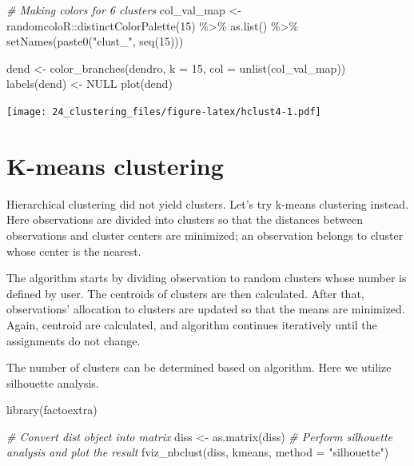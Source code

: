 \documentclass[
]{book}
\newenvironment{Shaded}{\begin{snugshade}}{\end{snugshade}}
\newcommand{\AttributeTok}[1]{\textcolor[rgb]{0.77,0.63,0.00}{#1}}
\newcommand{\CommentTok}[1]{\textcolor[rgb]{0.56,0.35,0.01}{\textit{#1}}}
\newcommand{\ConstantTok}[1]{\textcolor[rgb]{0.00,0.00,0.00}{#1}}
\newcommand{\DecValTok}[1]{\textcolor[rgb]{0.00,0.00,0.81}{#1}}
\newcommand{\FunctionTok}[1]{\textcolor[rgb]{0.00,0.00,0.00}{#1}}
\newcommand{\NormalTok}[1]{#1}
\newcommand{\OtherTok}[1]{\textcolor[rgb]{0.56,0.35,0.01}{#1}}
\newcommand{\SpecialCharTok}[1]{\textcolor[rgb]{0.00,0.00,0.00}{#1}}
\newcommand{\StringTok}[1]{\textcolor[rgb]{0.31,0.60,0.02}{#1}}
\begin{document}
\begin{Shaded}
\begin{Highlighting}[]
\CommentTok{\# Making colors for 6 clusters}
\NormalTok{col\_val\_map }\OtherTok{\textless{}{-}}\NormalTok{ randomcoloR}\SpecialCharTok{::}\FunctionTok{distinctColorPalette}\NormalTok{(}\DecValTok{15}\NormalTok{) }\SpecialCharTok{\%\textgreater{}\%}
  \FunctionTok{as.list}\NormalTok{() }\SpecialCharTok{\%\textgreater{}\%}
  \FunctionTok{setNames}\NormalTok{(}\FunctionTok{paste0}\NormalTok{(}\StringTok{"clust\_"}\NormalTok{, }\FunctionTok{seq}\NormalTok{(}\DecValTok{15}\NormalTok{)))}

\NormalTok{dend }\OtherTok{\textless{}{-}} \FunctionTok{color\_branches}\NormalTok{(dendro, }\AttributeTok{k =} \DecValTok{15}\NormalTok{, }\AttributeTok{col =} \FunctionTok{unlist}\NormalTok{(col\_val\_map))}
\FunctionTok{labels}\NormalTok{(dend) }\OtherTok{\textless{}{-}} \ConstantTok{NULL}
\FunctionTok{plot}\NormalTok{(dend)}
\end{Highlighting}
\end{Shaded}

\texttt{[image: 24\_clustering\_files/figure-latex/hclust4-1.pdf]}

\hypertarget{k-means-clustering}{%
\section{K-means clustering}\label{k-means-clustering}}

Hierarchical clustering did not yield clusters. Let's try k-means
clustering instead. Here observations are divided into clusters so
that the distances between observations and cluster centers are
minimized; an observation belongs to cluster whose center is the
nearest.

The algorithm starts by dividing observation to random clusters whose
number is defined by user. The centroids of clusters are then
calculated. After that, observations' allocation to clusters are
updated so that the means are minimized. Again, centroid are
calculated, and algorithm continues iteratively until the assignments
do not change.

The number of clusters can be determined based on algorithm. Here we
utilize silhouette analysis.

\begin{Shaded}
\begin{Highlighting}[]
\FunctionTok{library}\NormalTok{(factoextra)}


\CommentTok{\# Convert dist object into matrix}
\NormalTok{diss }\OtherTok{\textless{}{-}} \FunctionTok{as.matrix}\NormalTok{(diss)}
\CommentTok{\# Perform silhouette analysis and plot the result}
\FunctionTok{fviz\_nbclust}\NormalTok{(diss, kmeans, }\AttributeTok{method =} \StringTok{"silhouette"}\NormalTok{)}
\end{Highlighting}
\end{Shaded}
\end{document}
